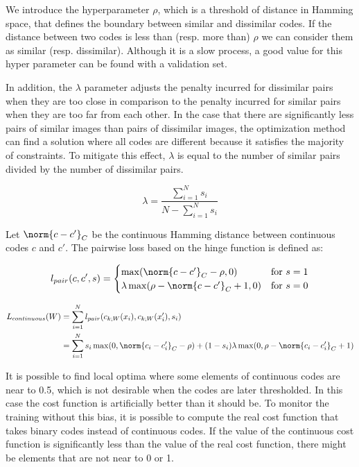 We introduce the hyperparameter $\rho$, which is a threshold of distance in Hamming space, that defines the boundary between similar and dissimilar codes. If the distance between two codes is less than (resp. more than) $\rho$ we can consider them as similar (resp. dissimilar). Although it is a slow process, a good value for this hyper parameter can be found with a validation set.

In addition, the $\lambda$ parameter adjusts the penalty incurred for dissimilar pairs when they are too close in comparison to the penalty incurred for similar pairs when they are too far from each other. In the case that there are significantly less pairs of similar images than pairs of dissimilar images, the optimization method can find a solution where all codes are different because it satisfies the majority of constraints. To mitigate this effect, $\lambda$ is equal to the number of similar pairs divided by the number of dissimilar pairs.

\[\lambda = \frac{\sum\limits_{i=1}^N s_i}{N - \sum\limits_{i=1}^N s_i}\]

Let $\norm{c - c'}_{C}$ be the continuous Hamming distance between continuous codes $c$ and $c'$. The pairwise loss based on the hinge function is defined as:

\[
	l_{pair}(c, c', s)=
	\begin{cases}
	\max(\norm{c - c'}_{C} - \rho, 0) & \text{for } s=1 \\
	\lambda\max(\rho - \norm{c - c'}_{C} + 1, 0) & \text{for } s=0
	\end{cases}
\]

\[
\begin{split}
L_{continuous}(W) & = \sum\limits_{i=1}^N l_{pair}(c_{k;W}(x_i), c_{k;W}(x'_i), s_i) \\
                  & = \sum\limits_{i=1}^N s_i\max(0, \norm{c_i - c'_i}_{C} - \rho) + (1-s_i)\lambda\max(0, \rho - \norm{c_i - c'_i}_{C} + 1)
\end{split}
\]

It is possible to find local optima where some elements of continuous codes are near to 0.5, which is not desirable when the codes are later thresholded. In this case the cost function is artificially better than it should be. To monitor the training without this bias, it is possible to compute the real cost function that takes binary codes instead of continuous codes. If the value of the continuous cost function is significantly less than the value of the real cost function, there might be elements that are not near to 0 or 1.

